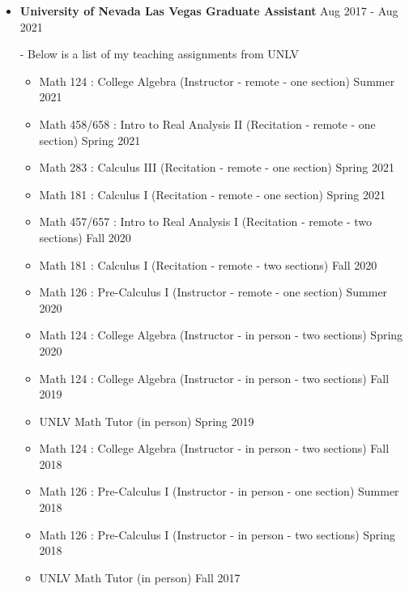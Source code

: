 \documentclass[letterpaper,12pt]{article}
\begin{document}
\begin{itemize}[itemsep = -0pt, topsep=0pt]
	\item \textbf{University of Nevada Las Vegas Graduate Assistant} {\hfill Aug 2017 - Aug 2021} \\ \vspace{.05in}

- Below is a list of my teaching assignments from UNLV \\ \vspace{.05in}

%

		\begin{itemize}
			\item Math 124 : College Algebra  (Instructor - remote - one section) \hfill Summer 2021
			\item Math 458/658 : Intro to Real Analysis II (Recitation - remote - one section) \hfill Spring 2021
			\item Math 283 : Calculus III (Recitation - remote - one section) \hfill Spring 2021
			\item Math 181 : Calculus I (Recitation - remote - one section) \hfill Spring 2021
			\item Math 457/657 : Intro to Real Analysis I (Recitation - remote - two sections) \hfill Fall 2020
			\item Math 181 : Calculus I (Recitation - remote - two sections) \hfill Fall 2020
			\item Math 126 : Pre-Calculus I  (Instructor - remote - one section) \hfill Summer 2020
			\item Math 124 : College Algebra  (Instructor - in person - two sections) \hfill Spring 2020
			\item Math 124 : College Algebra  (Instructor - in person - two sections) \hfill Fall 2019
			\item UNLV Math Tutor (in person) \hfill Spring 2019
			\item Math 124 : College Algebra  (Instructor - in person - two sections) \hfill Fall 2018
			\item Math 126 : Pre-Calculus I  (Instructor - in person - one section) \hfill Summer 2018
			\item Math 126 : Pre-Calculus I  (Instructor - in person - two sections) \hfill Spring 2018
			\item UNLV Math Tutor (in person) \hfill Fall 2017
		\end{itemize}
\end{itemize}
  
\end{document}
